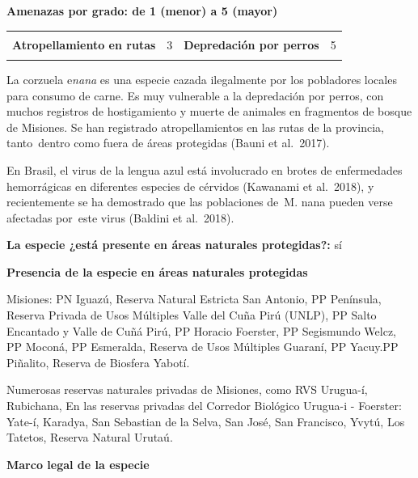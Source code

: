 \documentclass[
  x11names]{article}
\begin{document}
\vspace{-0.4cm}

\textbf{Amenazas por grado: de 1 (menor) a 5 (mayor)}

\begin{tabu} to 
\toprule
\textbf{} &  & \textbf{} & \\
\textbf{Atropellamiento en rutas} & 3 & \textbf{Depredación por perros} & 5\\
\textbf{} &  & \textbf{} & \\
\bottomrule
\end{tabu}

La corzuela e\textit{nana} es una especie cazada ilegalmente por los
pobladores locales para consumo de carne. Es muy vulnerable a la
depredación por perros, con muchos registros de hostigamiento y muerte
de animales en fragmentos de bosque de Misiones. Se han registrado
atropellamientos en las rutas de la provincia, tanto~dentro como fuera
de áreas protegidas (Bauni et al.~2017).

En Brasil, el virus de la lengua azul está involucrado en brotes de
enfermedades hemorrágicas en diferentes especies de cérvidos (Kawanami
et al.~2018), y recientemente se ha demostrado que las poblaciones de~M.
nana pueden verse afectadas por~este virus (Baldini et al.~2018).

\textbf{La especie ¿está presente en áreas naturales protegidas?:} sí

\textbf{Presencia de la especie en áreas naturales protegidas}

Misiones: PN Iguazú, Reserva Natural Estricta San Antonio, PP Península,
Reserva Privada de Usos Múltiples Valle del Cuña Pirú (UNLP), PP Salto
Encantado y Valle de Cuñá Pirú, PP Horacio Foerster, PP Segismundo
Welcz, PP Moconá, PP Esmeralda, Reserva de Usos Múltiples Guaraní, PP
Yacuy.PP Piñalito, Reserva de Biosfera Yabotí.

Numerosas reservas naturales privadas de Misiones, como RVS Urugua-í,
Rubichana, En las reservas privadas del Corredor Biológico Urugua-i -
Foerster: Yate-í, Karadya, San Sebastian de la Selva, San José, San
Francisco, Yvytú, Los Tatetos, Reserva Natural Urutaú.

\textbf{Marco legal de la especie}
\end{document}
